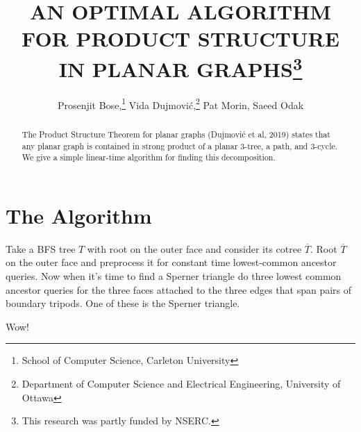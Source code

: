 \documentclass{patmorin}
\title{\MakeUppercase{An Optimal Algorithm for Product Structure in Planar Graphs}\thanks{This research was partly funded by NSERC.}}
\author{%
  Prosenjit Bose,\thanks{School of Computer Science, Carleton University}\qquad
  Vida Dujmović,\thanks{Department of Computer Science and Electrical Engineering, University of Ottawa}\qquad
  Pat Morin,\footnotemark[1]\qquad
  Saeed Odak\footnotemark[2]}
\date{}
\begin{document}
\maketitle

\begin{abstract}
  The Product Structure Theorem for planar graphs (Dujmović et al, 2019) states that any planar graph is contained in strong product of a planar $3$-tree, a path, and $3$-cycle.  We give a simple linear-time algorithm for finding this decomposition.
\end{abstract}

%

\section{The Algorithm}

Take a BFS tree $T$ with root on the outer face and consider its cotree $\overline{T}$.  Root $\overline{T}$ on the outer face and preprocess it for constant time lowest-common ancestor queries.  Now when it's time to find a Sperner triangle do three lowest common ancestor queries for the three faces attached to the three edges that span pairs of boundary tripods.  One of these is the Sperner triangle.

Wow!
\end{document}
